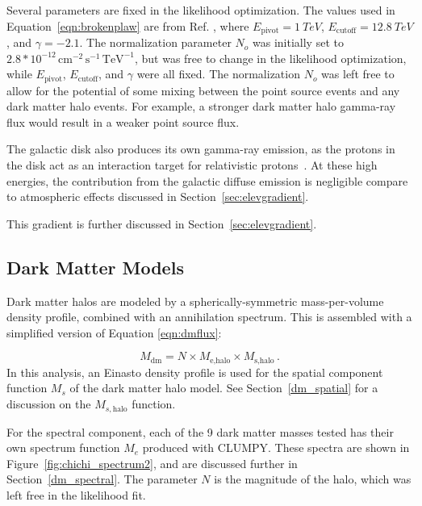   Several parameters are fixed in the likelihood optimization.
  The values used in Equation~\ref{eqn:brokenplaw} are from Ref. \cite{VeritasGCRidge2015}, where $E_{\textrm{pivot}}=\SI{1}{TeV}$, $E_{\textrm{cutoff}}=\SI{12.8}{TeV}$, and $\gamma=-2.1$.
  The normalization parameter $N_o$ was initially set to $2.8*{10}^{-12}\,\text{cm}^{-2}\,\text{s}^{-1}\,\text{TeV}^{-1}$, but was free to change in the likelihood optimization, while $E_{\textrm{pivot}}$, $E_{\textrm{cutoff}}$, and $\gamma$ were all fixed.
  The normalization $N_o$ was left free to allow for the potential of some mixing between the point source events and any dark matter halo events.
  For example, a stronger dark matter halo gamma-ray flux would result in a weaker point source flux.
  
  The galactic disk also produces its own gamma-ray emission, as the protons in the disk act as an interaction target for relativistic protons~\cite{tevgev_gc_diffuse}.
  At these high energies, the contribution from the galactic diffuse emission is negligible compare to atmospheric effects discussed in Section~\ref{sec:elevgradient}.
  
  This gradient is further discussed in Section~\ref{sec:elevgradient}.
  
  \subsection{Dark Matter Models}\label{subsec:dmhalomodel}
  Dark matter halos are modeled by a spherically-symmetric mass-per-volume density profile, combined with an annihilation spectrum.
  This is assembled with a simplified version of Equation \ref{eqn:dmflux}:
  
  \begin{equation}\label{eqn:dmmodel}
    M_{\textrm{dm}} = N \times M_{\textrm{e,halo}} \times M_{\textrm{s,halo}} \,.
  \end{equation}
  In this analysis, an Einasto density profile is used for the spatial component function $M_s$ of the dark matter halo model.
  See Section~\ref{dm_spatial} for a discussion on the $M_{s,\textrm{halo}}$ function.
  
  For the spectral component, each of the 9 dark matter masses tested has their own spectrum function $M_e$ produced with CLUMPY.
  These spectra are shown in Figure~\ref{fig:chichi_spectrum2}, and are discussed further in Section~\ref{dm_spectral}.
  The parameter $N$ is the magnitude of the halo, which was left free in the likelihood fit.

